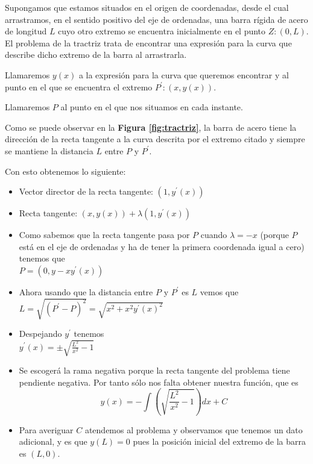 \documentclass{mathnotes}
\begin{document}
\begin{example}
Supongamos que estamos situados en el origen de coordenadas, desde el cual arrastramos, en el sentido positivo del eje de ordenadas, una barra rígida de acero de longitud $L$ cuyo otro extremo se encuentra inicialmente en el punto $Z:(0,L)$. El problema de la tractriz trata de encontrar una expresión para la curva que describe dicho extremo de la barra al arrastrarla.

Llamaremos $y(x)$ a la expresión para la curva que queremos encontrar y al punto en el que se encuentra el extremo $P^\prime:(x, y(x))$.

Llamaremos $P$ al punto en el que nos situamos en cada instante.

Como se puede observar en la \textbf{Figura \ref{fig:tractriz}}, la barra de acero tiene la dirección de la recta tangente a la curva descrita por el extremo citado y siempre se mantiene la distancia $L$ entre $P$ y $P^\prime$.

Con esto obtenemos lo siguiente:
\begin{itemize}
\item Vector director de la recta tangente: $(1, y^\prime(x))$
\item Recta tangente: $(x,y(x)) + \lambda(1, y^\prime(x))$
\item Como sabemos que la recta tangente pasa por $P$ cuando $\lambda = -x$ (porque $P$ está en el eje de ordenadas y ha de tener la primera coordenada igual a cero) tenemos que \\$P=(0, y-xy^\prime(x))$
\item Ahora usando que la distancia entre $P$ y $P^\prime$ es $L$ vemos que \\$L = \sqrt{(P^\prime-P)^2} = \sqrt{x^2+x^2y^\prime(x)^2}$
\item Despejando $y^\prime$ tenemos \\$y^\prime(x)=\pm\sqrt{\frac{L^2}{x^2}-1}$
\item Se escogerá la rama negativa porque la recta tangente del problema tiene pendiente negativa. Por tanto sólo nos falta obtener nuestra función, que es $$y(x) = -\int{(\sqrt{\frac{L^2}{x^2}-1})dx} + C$$
\item Para averiguar $C$ atendemos al problema y observamos que tenemos un dato adicional, y es que $y(L)=0$ pues la posición inicial del extremo de la barra es $(L,0)$.
\end{itemize}
\end{example}
\end{document}
